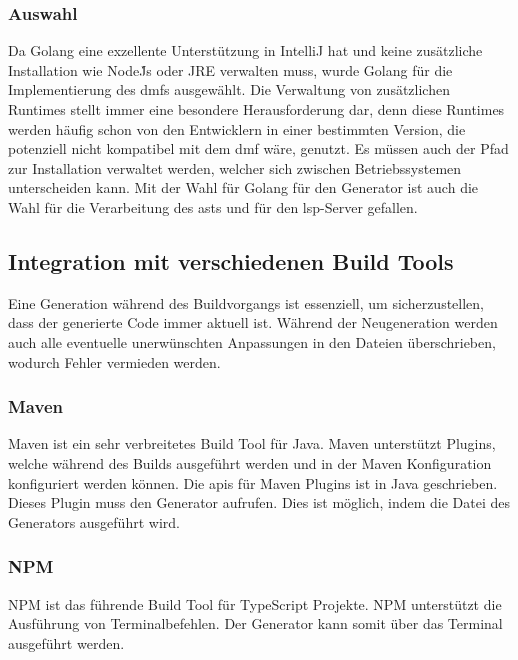 \documentclass[./einleitung.tex]{subfiles}
\begin{document}
\subsubsection{Auswahl}
Da Golang eine exzellente Unterstützung in IntelliJ hat und keine zusätzliche Installation wie Node\.Js oder JRE verwalten muss, wurde Golang für die Implementierung des \acrshort{dmf}s ausgewählt.
Die Verwaltung von zusätzlichen Runtimes stellt immer eine besondere Herausforderung dar, denn diese Runtimes werden häufig schon von den Entwicklern in einer bestimmten Version, die potenziell nicht kompatibel mit dem \acrshort{dmf} wäre, genutzt.
Es müssen auch der Pfad zur Installation verwaltet werden, welcher sich zwischen Betriebssystemen unterscheiden kann.
\newline
Mit der Wahl für Golang für den Generator ist auch die Wahl für die Verarbeitung des \acrshort{ast}s und für den \acrshort{lsp}-Server gefallen.

\subsection{Integration mit verschiedenen Build Tools}
Eine Generation während des Buildvorgangs ist essenziell, um sicherzustellen, dass der generierte Code immer aktuell ist.
Während der Neugeneration werden auch alle eventuelle unerwünschten Anpassungen in den Dateien überschrieben, wodurch Fehler vermieden werden.

\subsubsection{Maven}
Maven ist ein sehr verbreitetes Build Tool für Java.
Maven unterstützt Plugins, welche während des Builds ausgeführt werden und in der Maven Konfiguration konfiguriert werden können.
Die \acrlong{api}s für Maven Plugins ist in Java geschrieben.
Dieses Plugin muss den Generator aufrufen.
Dies ist möglich, indem die Datei des Generators ausgeführt wird.

\subsubsection{NPM}
NPM ist das führende Build Tool für TypeScript Projekte.
NPM unterstützt die Ausführung von Terminalbefehlen.
Der Generator kann somit über das Terminal ausgeführt werden.

\end{document}
